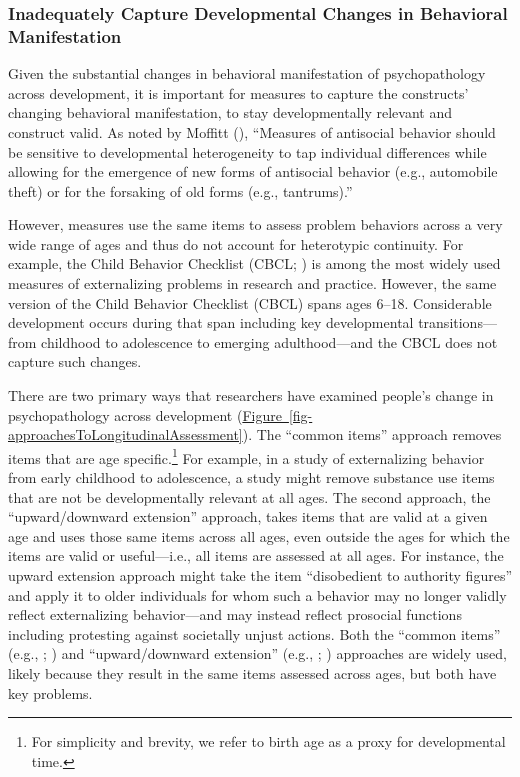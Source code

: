 \documentclass[
  american,
  letterpaper,
  12pt]{article}
\begin{document}
\subsubsection{Inadequately Capture Developmental Changes in Behavioral
Manifestation}\label{inadequately-capture-developmental-changes-in-behavioral-manifestation}

Given the substantial changes in behavioral manifestation of
psychopathology across development, it is important for measures to
capture the constructs' changing behavioral manifestation, to stay
developmentally relevant and construct valid. As noted by Moffitt
(), ``Measures of antisocial
behavior should be sensitive to developmental heterogeneity to tap
individual differences while allowing for the emergence of new forms of
antisocial behavior (e.g., automobile theft) or for the forsaking of old
forms (e.g., tantrums).''

However, measures use the same items to assess problem behaviors across
a very wide range of ages and thus do not account for heterotypic
continuity. For example, the Child Behavior Checklist (CBCL;
) is among the
most widely used measures of externalizing problems in research and
practice. However, the same version of the Child Behavior Checklist
(CBCL) spans ages 6--18. Considerable development occurs during that
span including key developmental transitions---from childhood to
adolescence to emerging adulthood---and the CBCL does not capture such
changes.

There are two primary ways that researchers have examined people's
change in psychopathology across development
(\hyperref[fig-approachesToLongitudinalAssessment]{Figure~\ref*{fig-approachesToLongitudinalAssessment}}).
The ``common items'' approach removes items that are age
specific.\footnote{For simplicity and brevity, we refer to birth age as
  a proxy for developmental time.} For example, in a study of
externalizing behavior from early childhood to adolescence, a study
might remove substance use items that are not be developmentally
relevant at all ages. The second approach, the ``upward/downward
extension'' approach, takes items that are valid at a given age and uses
those same items across all ages, even outside the ages for which the
items are valid or useful---i.e., all items are assessed at all ages.
For instance, the upward extension approach might take the item
``disobedient to authority figures'' and apply it to older individuals
for whom such a behavior may no longer validly reflect externalizing
behavior---and may instead reflect prosocial functions including
protesting against societally unjust actions. Both the ``common items''
(e.g., ;
) and ``upward/downward
extension'' (e.g., ; ) approaches are
widely used, likely because they result in the same items assessed
across ages, but both have key problems.
\end{document}
